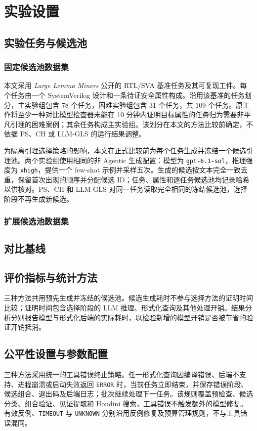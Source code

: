 \section{实验设置}
\subsection{实验任务与候选池}
\subsubsection{固定候选池数据集}
本文采用 \emph{Large Lemma Miners} 公开的 RTL/SVA 基准任务及其可复现工件\cite{peled2026large,peled2026artifact}。每个任务由一个 SystemVerilog 设计和一条待证安全属性构成。沿用该基准的任务划分，主实验组包含 78 个任务，困难实验组包含 31 个任务，共 109 个任务。原工作将至少一种对比模型检查器未能在 10 分钟内证明目标属性的任务归为需要非平凡引理的困难案例\cite{peled2026large}；其余任务构成主实验组。该划分在本文的方法比较前确定，不依据 PS、CH 或 LLM-GLS 的运行结果调整。

为隔离引理选择策略的影响，本文在正式比较前为每个任务生成并冻结一个候选引理池。两个实验组使用相同的非 Agentic 生成配置：模型为 \texttt{gpt-6.1-sol}，推理强度为 \texttt{xhigh}，提供一个 few-shot 示例并采样五次。生成的候选按文本完全一致去重，保留首次出现的顺序并分配候选 ID；任务、属性和逐任务候选池均记录哈希以供核对。PS、CH 和 LLM-GLS 对同一任务读取完全相同的冻结候选池，选择阶段不再生成新候选。

\subsubsection{扩展候选池数据集}
\mbox{}\par
\subsection{对比基线}
\mbox{}\par
\subsection{评价指标与统计方法}
三种方法共用预先生成并冻结的候选池。候选生成耗时不参与选择方法的证明时间比较；证明时间包含选择阶段的 LLM 推理、形式化查询及其他处理开销。结果分析分别报告模型与形式化后端的实际耗时，以检验新增的模型开销是否被节省的验证开销抵消。
\subsection{公平性设置与参数配置}
三种方法采用统一的工具错误终止策略。任一形式化查询因编译错误、后端不支持、进程崩溃或启动失败返回 \texttt{ERROR} 时，当前任务立即结束，并保存错误阶段、候选组合、退出码及后端日志；批次继续处理下一任务。该规则覆盖预检查、候选分类、组合验证、见证提取和 Houdini 搜索，工具错误不触发额外的模型修复。有效反例、\texttt{TIMEOUT} 与 \texttt{UNKNOWN} 分别沿用反例修复及预算管理规则，不与工具错误混同。
